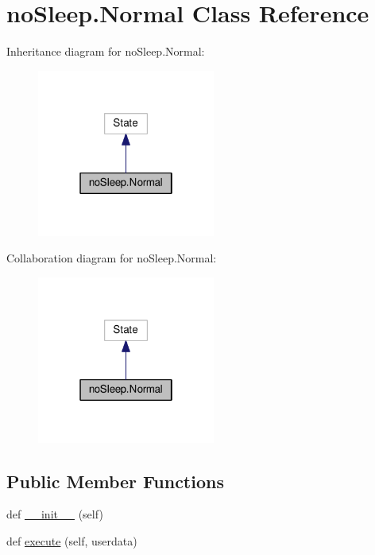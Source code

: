 \hypertarget{classnoSleep_1_1Normal}{}\section{no\+Sleep.\+Normal Class Reference}
\label{classnoSleep_1_1Normal}


Inheritance diagram for no\+Sleep.\+Normal\+:\nopagebreak
\begin{figure}[H]
\begin{center}
\leavevmode
\includegraphics[width=166pt]{classnoSleep_1_1Normal__inherit__graph}
\end{center}
\end{figure}


Collaboration diagram for no\+Sleep.\+Normal\+:\nopagebreak
\begin{figure}[H]
\begin{center}
\leavevmode
\includegraphics[width=166pt]{classnoSleep_1_1Normal__coll__graph}
\end{center}
\end{figure}
\subsection*{Public Member Functions}
\begin{DoxyCompactItemize}
\item 
def \hyperlink{classnoSleep_1_1Normal_a408dace152fbaea3a755a27ded06b1a5}{\+\_\+\+\_\+init\+\_\+\+\_\+} (self)
\item 
def \hyperlink{classnoSleep_1_1Normal_ad4ca86ae46f2a71c2e8fc58efeb6e152}{execute} (self, userdata)
\end{DoxyCompactItemize}
